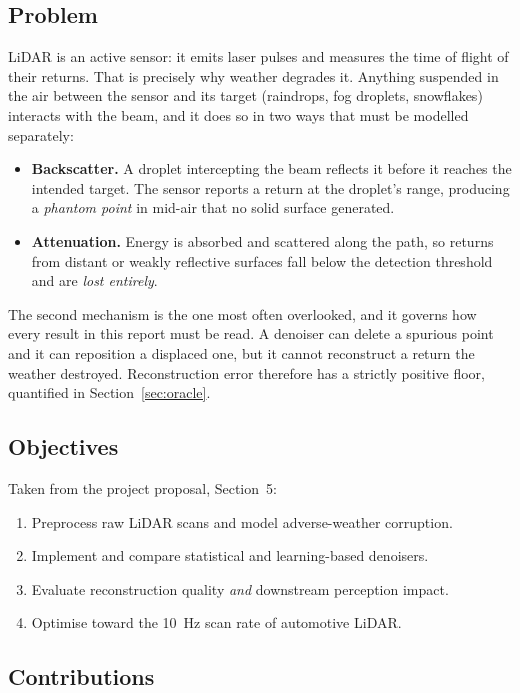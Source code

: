 \documentclass[11pt,a4paper]{article}
\begin{document}
\subsection{Problem}

LiDAR is an active sensor: it emits laser pulses and measures the time of
flight of their returns. That is precisely why weather degrades it. Anything
suspended in the air between the sensor and its target (raindrops, fog
droplets, snowflakes) interacts with the beam, and it does so in two ways
that must be modelled separately:

\begin{itemize}
\item \textbf{Backscatter.} A droplet intercepting the beam reflects it before
it reaches the intended target. The sensor reports a return at the droplet's
range, producing a \emph{phantom point} in mid-air that no solid surface
generated.
\item \textbf{Attenuation.} Energy is absorbed and scattered along the path,
so returns from distant or weakly reflective surfaces fall below the
detection threshold and are \emph{lost entirely}.
\end{itemize}

The second mechanism is the one most often overlooked, and it governs how
every result in this report must be read. A denoiser can delete a spurious
point and it can reposition a displaced one, but it cannot reconstruct a
return the weather destroyed. Reconstruction error therefore has a strictly
positive floor, quantified in Section~\ref{sec:oracle}.

\subsection{Objectives}

Taken from the project proposal, Section~5:

\begin{enumerate}
\item Preprocess raw LiDAR scans and model adverse-weather corruption.
\item Implement and compare statistical and learning-based denoisers.
\item Evaluate reconstruction quality \emph{and} downstream perception impact.
\item Optimise toward the 10~Hz scan rate of automotive LiDAR.
\end{enumerate}

\subsection{Contributions}
\end{document}
